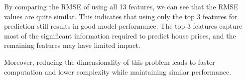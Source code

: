 \documentclass{article}
\begin{document}
By comparing the RMSE of using all 13 features, we can see that the RMSE values are quite similar. This indicates that using only the top 3 features for prediction still results in good model performance. The top 3 features capture most of the significant information required to predict house prices, and the remaining features may have limited impact. 

Moreover, reducing the dimensionality of this problem leads to faster computation and lower complexity while maintaining similar performance.
\end{document}

